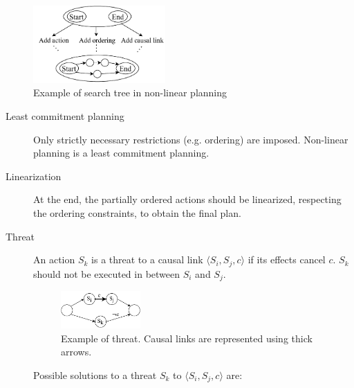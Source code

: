 \begin{figure}[h]
    \centering
    \includegraphics[width=0.45\textwidth]{img/_nonlinear_plan_example.pdf}
    \caption{Example of search tree in non-linear planning}
\end{figure}


\begin{description}
    \item[Least commitment planning] 
        Only strictly necessary restrictions (e.g. ordering) are imposed.
        Non-linear planning is a least commitment planning.

    \item[Linearization]  
        At the end, the partially ordered actions should be linearized, 
        respecting the ordering constraints, to obtain the final plan.
\end{description}


\begin{description}
    \item[Threat]  
        An action $S_k$ is a threat to a causal link $\langle S_i, S_j, c \rangle$ 
        if its effects cancel $c$.
        $S_k$ should not be executed in between $S_i$ and $S_j$.

        \begin{figure}[H]
            \centering
            \includegraphics[width=0.3\textwidth]{img/_threat_example.pdf}
            \caption{Example of threat. Causal links are represented using thick arrows.}
        \end{figure}

        Possible solutions to a threat $S_k$ to $\langle S_i, S_j, c \rangle$ are:
\end{description}

